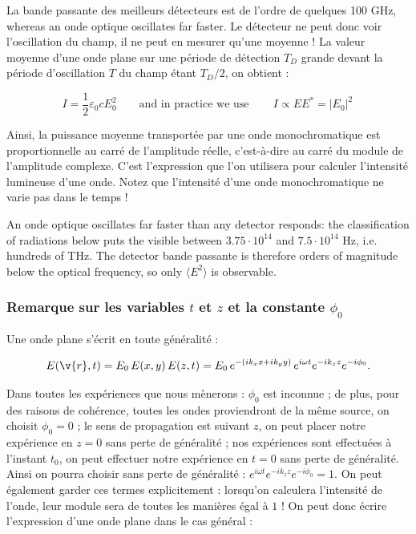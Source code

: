 La bande passante des meilleurs détecteurs est de l'ordre de quelques 100 GHz,
whereas an onde optique oscillates far faster. Le détecteur ne peut donc voir
l'oscillation du champ, il ne peut en mesurer qu'une moyenne ! La valeur moyenne
d'une onde plane sur une période de détection $T_D$ grande devant la période
d'oscillation $T$ du champ étant $T_D/2$, on obtient :

\[
  I=\frac{1}{2}\varepsilon_0cE_0^2
  \qquad\text{and in practice we use}\qquad
  \boxed{\,I\propto EE^{*}=|E_0|^{2}\,}
\]

Ainsi, la puissance moyenne transportée par une onde monochromatique est
proportionnelle au carré de l'amplitude réelle, c'est-à-dire au carré du module
de l'amplitude complexe. C'est l'expression que l'on utilisera pour calculer
l'intensité lumineuse d'une onde. Notez que l'intensité d'une onde
monochromatique ne varie pas dans le temps !

\begin{remark}
  An onde optique oscillates far faster than any detector responds: the
  classification of radiations below puts the visible between
  $3.75\cdot 10^{14}$ and $7.5\cdot 10^{14}$ Hz, i.e. hundreds of THz. The
  detector bande passante is therefore orders of magnitude below the optical
  frequency, so only $\langle E^2\rangle$ is observable.
\end{remark}

\subsubsection{Remarque sur les variables $t$ et $z$ et la constante $\phi_0$}

Une onde plane s'écrit en toute généralité :

\[
  E(\v{r},t)=E_0\,E(x,y)\,E(z,t)=E_0\,e^{-(ik_xx+ik_yy)}\,e^{i\omega t}e^{-ik_zz}e^{-i\phi_0}.
\]

Dans toutes les expériences que nous mènerons : $\phi_0$ est inconnue ; de plus,
pour des raisons de cohérence, toutes les ondes proviendront de la même source,
on choisit $\phi_0=0$ ; le sens de propagation est suivant $z$, on peut placer
notre expérience en $z=0$ sans perte de généralité ; nos expériences sont
effectuées à l'instant $t_0$, on peut effectuer notre expérience en $t=0$ sans
perte de généralité. Ainsi on pourra choisir sans perte de généralité :
$e^{i\omega t}e^{-ik_zz}e^{-i\phi_0}=1$. On peut également garder ces termes
explicitement : lorsqu'on calculera l'intensité de l'onde, leur module sera de
toutes les manières égal à $1$ ! On peut donc écrire l'expression d'une onde
plane dans le cas général :

